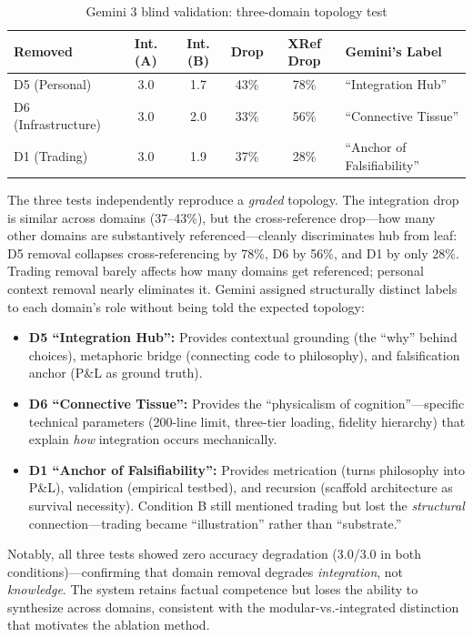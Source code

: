 \documentclass[12pt,letterpaper]{article}
\begin{document}
\begin{table}[H]
\centering
\caption{Gemini 3 blind validation: three-domain topology test}
\label{tab:gemini3-topology}
\begin{tabular}{lccccl}
\toprule
\textbf{Removed} & \textbf{Int. (A)} & \textbf{Int. (B)} & \textbf{Drop} & \textbf{XRef Drop} & \textbf{Gemini's Label} \\
\midrule
D5 (Personal) & 3.0 & 1.7 & 43\% & 78\% & ``Integration Hub'' \\
D6 (Infrastructure) & 3.0 & 2.0 & 33\% & 56\% & ``Connective Tissue'' \\
D1 (Trading) & 3.0 & 1.9 & 37\% & 28\% & ``Anchor of Falsifiability'' \\
\bottomrule
\end{tabular}
\end{table}

The three tests independently reproduce a \emph{graded} topology. The integration drop is similar across domains (37--43\%), but the cross-reference drop---how many other domains are substantively referenced---cleanly discriminates hub from leaf: D5 removal collapses cross-referencing by 78\%, D6 by 56\%, and D1 by only 28\%. Trading removal barely affects how many domains get referenced; personal context removal nearly eliminates it. Gemini assigned structurally distinct labels to each domain's role without being told the expected topology:

\begin{itemize}[nosep]
  \item \textbf{D5 ``Integration Hub'':} Provides contextual grounding (the ``why'' behind choices), metaphoric bridge (connecting code to philosophy), and falsification anchor (P\&L as ground truth).
  \item \textbf{D6 ``Connective Tissue'':} Provides the ``physicalism of cognition''---specific technical parameters (200-line limit, three-tier loading, fidelity hierarchy) that explain \emph{how} integration occurs mechanically.
  \item \textbf{D1 ``Anchor of Falsifiability'':} Provides metrication (turns philosophy into P\&L), validation (empirical testbed), and recursion (scaffold architecture as survival necessity). Condition B still mentioned trading but lost the \emph{structural} connection---trading became ``illustration'' rather than ``substrate.''
\end{itemize}

Notably, all three tests showed zero accuracy degradation (3.0/3.0 in both conditions)---confirming that domain removal degrades \emph{integration}, not \emph{knowledge}. The system retains factual competence but loses the ability to synthesize across domains, consistent with the modular-vs.-integrated distinction that motivates the ablation method.
\end{document}
